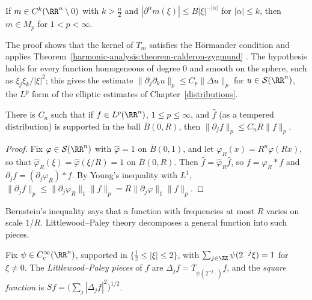 \begin{theorem}[Mikhlin]\label{harmonic-analysis:theorem-mikhlin}
If $m \in C^k(\RR^n \setminus 0)$ with $k > \frac n2$ and $|\partial^\alpha m(\xi)| \leq B|\xi|^{-|\alpha|}$ for $|\alpha| \leq k$, then $m \in M_p$ for $1 < p < \infty$.
\end{theorem}

The proof shows that the kernel of $T_m$ satisfies the H\"ormander condition and applies Theorem~\ref{harmonic-analysis:theorem-calderon-zygmund} \cite{grafakos-classical}. The hypothesis holds for every function homogeneous of
degree $0$ and smooth on the sphere, such as $\xi_j\xi_k/|\xi|^2$; this gives the estimate $\|\partial_j\partial_ku\|_p \leq C_p\|\Delta u\|_p$ for $u \in \mathcal{S}(\RR^n)$, the $L^p$ form of the elliptic estimates of
Chapter~\ref{distributions}.

\begin{proposition}\label{harmonic-analysis:proposition-bernstein-inequality}
There is $C_n$ such that if $f \in L^p(\RR^n)$, $1 \leq p \leq \infty$, and $\hat f$ (as a tempered distribution) is supported in the ball $\overline{B}(0, R)$, then $\|\partial_jf\|_p \leq C_nR\|f\|_p$.
\end{proposition}

\begin{proof}
Fix $\varphi \in \mathcal{S}(\RR^n)$ with $\hat\varphi = 1$ on $\overline{B}(0, 1)$, and let $\varphi_R(x) = R^n\varphi(Rx)$, so that $\hat\varphi_R(\xi) = \hat\varphi(\xi/R) = 1$ on $\overline{B}(0, R)$. Then $\hat f = \hat\varphi_R\hat f$, so
$f = \varphi_R * f$ and $\partial_jf = (\partial_j\varphi_R) * f$. By Young's inequality with $L^1$, $\|\partial_jf\|_p \leq \|\partial_j\varphi_R\|_1\|f\|_p = R\|\partial_j\varphi\|_1\|f\|_p$.
\end{proof}

Bernstein's inequality says that a function with frequencies at most $R$ varies on scale $1/R$. Littlewood--Paley theory decomposes a general function into such pieces.

\begin{definition}\label{harmonic-analysis:definition-littlewood-paley}
Fix $\psi \in C_c^\infty(\RR^n)$, supported in $\{\frac12 \leq |\xi| \leq 2\}$, with $\sum_{j \in \ZZ}\psi(2^{-j}\xi) = 1$ for $\xi \neq 0$. The \emph{Littlewood--Paley pieces} of $f$ are $\Delta_jf = T_{\psi(2^{-j}\cdot)}f$, and the
\emph{square function} is $Sf = \bigl(\sum_j|\Delta_jf|^2\bigr)^{1/2}$.
\end{definition}

